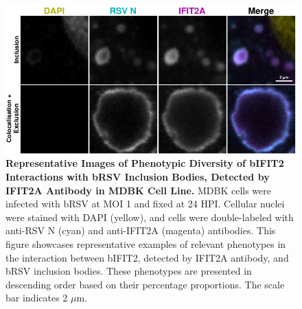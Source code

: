 \begin{figure}
    \centering
    \includegraphics[width=1\linewidth]{08. Chapter 3/Figs/02. Infection/02. IFIT2/01. IFIT2A/15. i2a mdbk brsv.pdf} 
    \caption[Representative Images of Phenotypic Diversity of bIFIT2 Interactions with bRSV Inclusion Bodies, Detected by IFIT2A Antibody in MDBK Cell Line.]{\textbf{Representative Images of Phenotypic Diversity of bIFIT2 Interactions with bRSV Inclusion Bodies, Detected by IFIT2A Antibody in MDBK Cell Line.} MDBK cells were infected with bRSV at MOI 1 and fixed at 24 HPI. Cellular nuclei were stained with DAPI (yellow), and cells were double-labeled with anti-RSV N (cyan) and anti-IFIT2A (magenta) antibodies. This figure showcases representative examples of relevant phenotypes in the interaction between bIFIT2, detected by IFIT2A antibody, and bRSV inclusion bodies. These phenotypes are presented in descending order based on their percentage proportions. The scale bar indicates 2 \(\mu \mbox{m}\).}
    \label{fig:Representative Images of Phenotypic Diversity of bIFIT2 Interactions with bRSV Inclusion Bodies, Detected by IFIT2A Antibody in MDBK Cell Line}
\end{figure}

